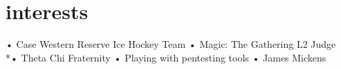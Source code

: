 \documentclass[]{friggeri-cv}
\begin{document}
\section{interests}
•	Case Western Reserve Ice Hockey Team
•	Magic: The Gathering L2 Judge
\\*•	Theta Chi Fraternity
•	Playing with pentesting tools
•	James Mickens
% 
\end{document}
